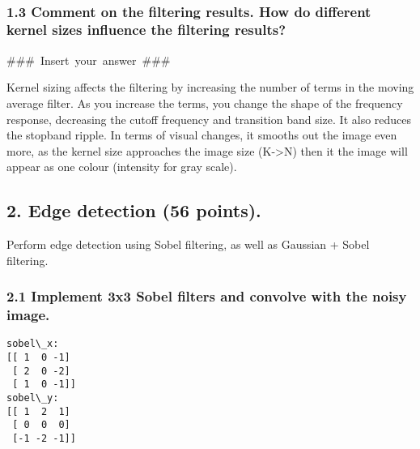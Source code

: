 \documentclass[11pt]{article}
\begin{document}
    \begin{center}
    \end{center}
    { \hspace*{\fill} \\}
    
    \hypertarget{comment-on-the-filtering-results.-how-do-different-kernel-sizes-influence-the-filtering-results}{%
\subsubsection{1.3 Comment on the filtering results. How do different
kernel sizes influence the filtering
results?}\label{comment-on-the-filtering-results.-how-do-different-kernel-sizes-influence-the-filtering-results}}

    \#\#\#~Insert~your~answer~\#\#\#

Kernel sizing affects the filtering by increasing the number of terms in
the moving average filter. As you increase the terms, you change the
shape of the frequency response, decreasing the cutoff frequency and
transition band size. It also reduces the stopband ripple. In terms of
visual changes, it smooths out the image even more, as the kernel size
approaches the image size (K-\textgreater N) then it the image will
appear as one colour (intensity for gray scale).

    \hypertarget{edge-detection-56-points.}{%
\subsection{2. Edge detection (56
points).}\label{edge-detection-56-points.}}

Perform edge detection using Sobel filtering, as well as Gaussian +
Sobel filtering.

    \hypertarget{implement-3x3-sobel-filters-and-convolve-with-the-noisy-image.}{%
\subsubsection{2.1 Implement 3x3 Sobel filters and convolve with the
noisy
image.}\label{implement-3x3-sobel-filters-and-convolve-with-the-noisy-image.}}

    \begin{Verbatim}[commandchars=\\\{\}]
sobel\_x:
[[ 1  0 -1]
 [ 2  0 -2]
 [ 1  0 -1]]
sobel\_y:
[[ 1  2  1]
 [ 0  0  0]
 [-1 -2 -1]]
    \end{Verbatim}
\end{document}
